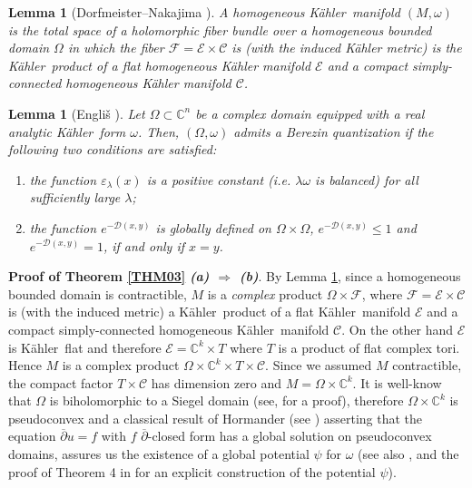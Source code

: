 \documentclass[reqno]{amsart}
\newtheorem{lem}[thm]{Lemma}
\begin{document}
\begin{lem}[Dorfmeister--Nakajima \cite{DN88}]\label{THMA}
A homogeneous {K\"{a}hler}\ manifold $(M, \omega)$  is the total space of a holomorphic
fiber bundle over a homogeneous bounded domain $\Omega$ in which the fiber ${\mathcal F} ={\mathcal E} \times {\mathcal C}$
is (with the
induced K\"ahler metric) is the  {K\"{a}hler}\ product of a flat homogeneous K\"ahler manifold ${\mathcal E}$ and a
compact simply-connected homogeneous K\"ahler manifold ${\mathcal C}$.
\end{lem}

\begin{lem}[Engli\v{s} \cite{englis}]\label{thmberezin}
Let $\Omega\subset {\mathbb{C}}^n$ be a complex domain equipped with a real analytic  {K\"{a}hler}\ form $\omega$.
Then, $(\Omega, \omega)$ admits a Berezin quantization if the following two  conditions are satisfied:
\begin{enumerate}
\item
the function ${{\varepsilon}}_{\lambda}(x)$ is a positive constant (i.e. ${\lambda} \omega$ is balanced) for all sufficiently large $\lambda$;
\item
the function $e^{-{\mathcal{D}}(x, y)}$  is globally defined on $\Omega\times\Omega$,  $e^{-{\mathcal{D}}(x, y)}\leq1$  and $e^{-{\mathcal{D}}(x, y)}=1$,  if and only if $x=y$.
\end{enumerate}
\end{lem}

\noindent
{\bf Proof of Theorem \ref{THM03}} 
\noindent
\emph{\bf (a) $\Rightarrow$ (b)}.
By Lemma \ref{THMA}, since a homogeneous bounded domain is contractible, $M$ is a {\em complex}
product $\Omega \times {\mathcal F}$, where  ${\mathcal F}={\mathcal E}\times {\mathcal C}$ is (with the induced metric) a {K\"{a}hler}\ product  of a flat  {K\"{a}hler}\ manifold ${\mathcal E}$ and a compact simply-connected homogeneous {K\"{a}hler}\ manifold ${\mathcal C}$. On the other hand
${\mathcal E}$ is {K\"{a}hler}\ flat and therefore ${\mathcal E}={\mathbb{C}}^k\times T$ where $T$  is a product of flat complex tori. Hence $M$ is a {complex}
product $\Omega \times {\mathbb{C}}^k\times T \times {\mathcal C}$. Since we assumed $M$ contractible, the compact factor $T \times {\mathcal C}$ has dimension zero and $M=\Omega \times {\mathbb{C}}^k$.  It is well-know that $\Omega$ is biholomorphic to a Siegel domain  (see, \cite{vinberg} for a proof), therefore  $\Omega \times {\mathbb{C}}^k$ is pseudoconvex and a classical result of Hormander (see \cite{bulletin}) asserting that the equation ${{\overline{\partial}}} u = f$ with $f$ ${{\overline{\partial}}}$-closed form has a global solution on pseudoconvex domains, assures us the existence of a global potential $\psi$ for $\omega$ (see also \cite{mossa3, M04}, and the proof of Theorem 4 in \cite{dlh} for an explicit construction of the potential $\psi$).
\end{document}
